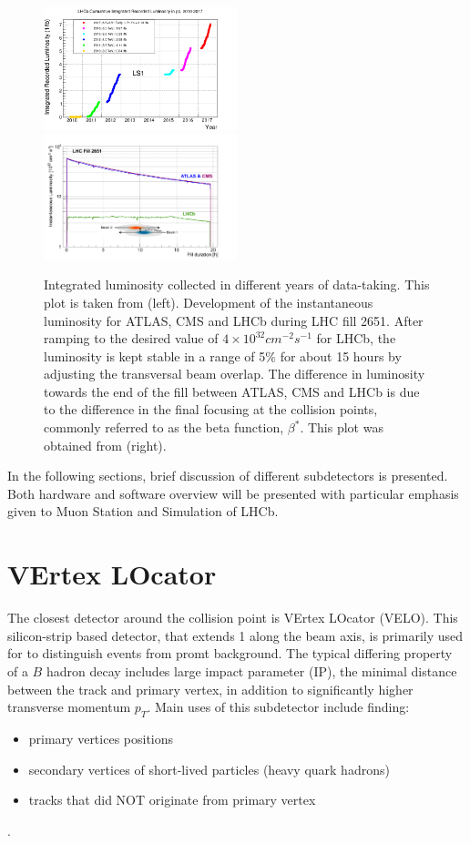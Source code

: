 \begin{figure}
	\centering
	\includegraphics[width = 0.5\textwidth]{figs/detector/intlumi.png}%
        \includegraphics[width = 0.5\textwidth]{figs/detector/lumicompare.png}
	\caption{Integrated luminosity collected in different years of data-taking. This plot is taken from \cite{lumiover} (left). Development of the instantaneous luminosity for \Gls{ATLAS}, \Gls{CMS} and \Gls{LHCb} during LHC fill 2651. After ramping to the desired value of $4\times10^{32}cm^{-2}s^{-1}$
for LHCb, the luminosity is kept stable in a range of 5$\%$ for about 15 hours by adjusting the transversal beam overlap. The difference in luminosity towards the end of the fill between ATLAS, \Gls{CMS} and \Gls{LHCb} is due to the difference in the final focusing at the collision points, commonly referred to as the beta function, $\beta^{*}$. This plot was obtained from \cite{LHCb-DP-2014-002} (right).}
	\label{fig:lhcbintlumi}
\end{figure}

In the following sections, brief discussion of different subdetectors is presented. Both hardware and software overview will be presented with particular emphasis given to Muon Station and Simulation of LHCb.

\section{VErtex LOcator}
The closest detector around the collision point is VErtex LOcator (\Gls{VELO}). This silicon-strip based detector, that extends 1 \m along the beam axis, is primarily used for to distinguish events from promt background. The typical differing property of a $B$ hadron decay includes large impact parameter (\Gls{IP}), the minimal distance between the track and primary vertex, in addition to significantly higher transverse momentum $p_{T}$. Main uses of this subdetector include finding: 
\begin{itemize}
\item primary vertices positions
\item secondary vertices of short-lived particles (heavy quark hadrons)
\item tracks that did NOT originate from primary vertex
\end{itemize}.


